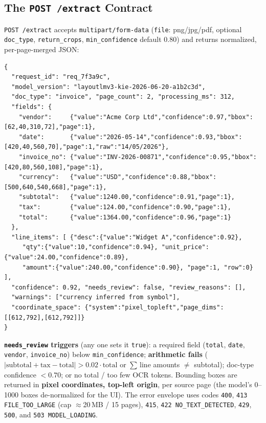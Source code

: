 \documentclass[12pt,a4paper]{article}
\begin{document}
\subsection{The \texttt{POST /extract} Contract}

\texttt{POST /extract} accepts \texttt{multipart/form-data} (\texttt{file}: png/jpg/pdf,
optional \texttt{doc\_type}, \texttt{return\_crops}, \texttt{min\_confidence} default
0.80) and returns normalized, per-page-merged JSON:

\begin{lstlisting}[basicstyle=\ttfamily\footnotesize]
{
  "request_id": "req_7f3a9c",
  "model_version": "layoutlmv3-kie-2026-06-20-a1b2c3d",
  "doc_type": "invoice", "page_count": 2, "processing_ms": 312,
  "fields": {
    "vendor":     {"value":"Acme Corp Ltd","confidence":0.97,"bbox":[62,40,310,72],"page":1},
    "date":       {"value":"2026-05-14","confidence":0.93,"bbox":[420,40,560,70],"page":1,"raw":"14/05/2026"},
    "invoice_no": {"value":"INV-2026-00871","confidence":0.95,"bbox":[420,80,560,108],"page":1},
    "currency":   {"value":"USD","confidence":0.88,"bbox":[500,640,540,668],"page":1},
    "subtotal":   {"value":1240.00,"confidence":0.91,"page":1},
    "tax":        {"value":124.00,"confidence":0.90,"page":1},
    "total":      {"value":1364.00,"confidence":0.96,"page":1}
  },
  "line_items": [ {"desc":{"value":"Widget A","confidence":0.92},
     "qty":{"value":10,"confidence":0.94}, "unit_price":{"value":24.00,"confidence":0.89},
     "amount":{"value":240.00,"confidence":0.90}, "page":1, "row":0} ],
  "confidence": 0.92, "needs_review": false, "review_reasons": [],
  "warnings": ["currency inferred from symbol"],
  "coordinate_space": {"system":"pixel_topleft","page_dims":[[612,792],[612,792]]}
}
\end{lstlisting}

\noindent\textbf{\texttt{needs\_review} triggers} (any one sets it \texttt{true}): a
required field (\texttt{total}, \texttt{date}, \texttt{vendor}, \texttt{invoice\_no})
below \texttt{min\_confidence}; \textbf{arithmetic fails}
($|\text{subtotal}+\text{tax}-\text{total}| > 0.02\cdot\text{total}$ or
$\sum$\,line amounts $\neq$ subtotal); doc-type confidence $<0.70$; or no total / too few
OCR tokens. Bounding boxes are returned in \textbf{pixel coordinates, top-left origin},
per source page (the model's 0--1000 boxes de-normalized for the UI). The error envelope
uses codes \texttt{400}, \texttt{413 FILE\_TOO\_LARGE} (cap $\approx$20\,MB / 15 pages),
\texttt{415}, \texttt{422 NO\_TEXT\_DETECTED}, \texttt{429}, \texttt{500}, and
\texttt{503 MODEL\_LOADING}.
\end{document}

